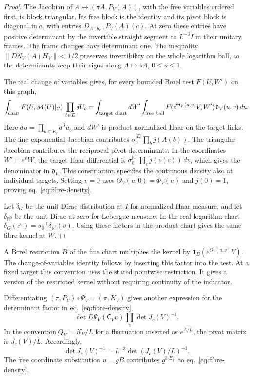 \documentclass[11pt,letterpaper,reqno]{amsart}
\numberwithin{equation}{section}
\renewcommand{\eqref}[1]{\textup{eq.~\ref{#1}}}
\theoremstyle{definition}
\theoremstyle{remark}
\begin{document}
\begin{proof}
The Jacobian of \(A\mapsto(\pi A,P_V(A))\), with the free
variables ordered first, is block triangular. Its free block
is the identity and its pivot block is diagonal in \(c\),
with entries \(D_{A(b_c)}P_V(A)(c)\). At zero these entries have
positive determinant by the invertible straight segment to
\(L^{-3}I\) in their unitary frames. The frame changes have
determinant one. The inequality \(\|DN_V(A)H_V\|<1/2\)
preserves invertibility on the whole logarithm ball, so the
determinants keep their signs along \(A\mapsto sA\),
\(0\leq s\leq1\).

The real change of variables gives, for every bounded Borel
test \(F(U,W')\) on this graph,
\[
 \int_{\rm chart}F(U,\mathcal M(U)|_C)\,\prod_{b\in E}dU_b
 =
 \int_{\rm target\ chart} dW'
   \int_{\rm free\ ball}
      F(e^{\Theta_V(u,v)}V,W')\,\mathfrak d_V(u,v)\,du .
\]
Here \(du=\prod_{b\in E_f}d^3u_b\) and \(dW'\) is product
normalized Haar on the target links. The fine exponential
Jacobian contributes \(\sigma_0^{|E|}\prod_b j(A(b))\).
The triangular Jacobian contributes the reciprocal pivot
determinants. In the coordinates \(W'=e^vW\), the target Haar
differential is \(\sigma_0^{|C|}\prod_c j(v(c))\,dv\), which
gives the denominator in \(\mathfrak d_V\).
This construction specifies the continuous density also at
individual targets. Setting \(v=0\) uses \(\Theta_V(u,0)=\Phi_V(u)\)
and \(j(0)=1\), proving \eqref{eq:fibre-density}.

Let \(\delta_G\) be the unit Dirac distribution at \(I\)
for normalized Haar measure, and let
\(\delta_{\mathbb R^3}\) be the unit Dirac at zero for
Lebesgue measure. In the real logarithm chart
\(\delta_G(e^v)=\sigma_0^{-1}\delta_{\mathbb R^3}(v)\).
Using these factors in the product chart gives the same
fibre kernel at \(W\).
\end{proof}

A Borel restriction \(B\) of the fine chart multiplies the kernel
by \(\mathbf 1_B(e^{\Theta_V(u,v)}V)\). The change-of-variables
identity follows by inserting this factor into the test. At a
fixed target this convention uses the stated pointwise restriction.
It gives a version of the restricted kernel without requiring
continuity of the indicator.

Differentiating $(\pi,P_V)\circ\Psi_V=(\pi,K_V)$ gives another expression for
the determinant factor in \eqref{eq:fibre-density},
\[
 \det D\Psi_V(\mathsf C_Vu)\prod_c\det J_c(V)^{-1}.
\]
In the convention $Q_V=K_V/L$ for a fluctuation inserted as $e^{A/L}$, the
pivot matrix is $J_c(V)/L$. Accordingly,
\[
 \det J_c(V)^{-1}=L^{-3}\det(J_c(V)/L)^{-1}.
\]
The free coordinate substitution $u=gB$ contributes $g^{3|E_f|}$ to \eqref{eq:fibre-density}.
\end{document}
